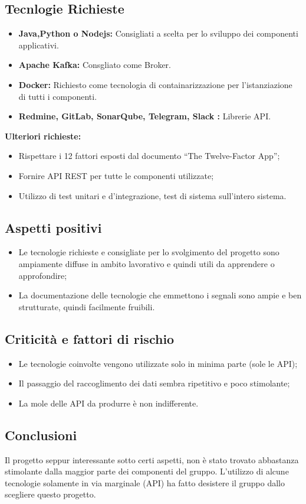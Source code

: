 \documentclass[a4paper, 11pt]{article}
\begin{document}
\subsection{Tecnlogie Richieste}
\begin{itemize}
\item \textbf{Java,Python o Nodejs:} Consigliati a scelta per lo sviluppo dei componenti applicativi.
\item \textbf{Apache Kafka:} Consgliato come Broker.
\item \textbf{Docker:} Richiesto come tecnologia di containarizzazione per l’istanziazione di tutti i componenti.
\item \textbf{Redmine, GitLab, SonarQube, Telegram, Slack :} Librerie API.
\end{itemize}
\textbf{Ulteriori richieste:}
\begin{itemize}
\item Rispettare i 12 fattori esposti dal documento “The Twelve-Factor App”;
\item Fornire API REST per tutte le componenti utilizzate;
\item Utilizzo di test unitari e d’integrazione, test di sistema sull’intero sistema.
\end{itemize}
\subsection{Aspetti positivi}
\begin{itemize}
\item Le tecnologie richieste e consigliate per lo svolgimento del progetto sono ampiamente diffuse in ambito lavorativo e quindi utili da apprendere o approfondire;
\item La documentazione delle tecnologie che emmettono i segnali sono ampie e ben strutturate, quindi facilmente fruibili.
\end{itemize}
\subsection{Criticità e fattori di rischio}
\begin{itemize}
\item Le tecnologie coinvolte vengono utilizzate solo in minima parte (sole le API);
\item Il passaggio del raccoglimento dei dati sembra ripetitivo e poco stimolante;
\item La mole delle API da produrre è non indifferente.
\end{itemize}
\subsection{Conclusioni}
Il progetto seppur interessante sotto certi aspetti, non è stato trovato abbastanza stimolante dalla maggior parte dei componenti del gruppo.
L’utilizzo di alcune tecnologie solamente in via marginale (API) ha fatto desistere il gruppo dallo scegliere questo progetto.
\end{document}
